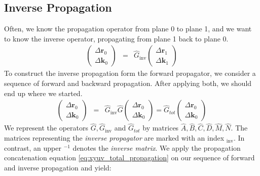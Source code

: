 \documentclass[12pt,a4paper,twoside,openright,BCOR10mm,headsepline,titlepage,abstracton,chapterprefix,final]{scrreprt}
\newcommand\Vector[1]{{\mathbf{#1}}}
\newcommand\wavenumber{k}
\newcommand\Wavevector{\Vector{\wavenumber}}
\begin{document}
\subsection{Inverse Propagation}
Often, we know the propagation operator from plane 0 to plane 1, and we want to know the inverse operator,
propagating from plane 1 back to plane 0.
\begin{eqnarray}
 \begin{pmatrix}
  \Delta \Vector{r}_{0} \\ \Delta \Wavevector_{0}
 \end{pmatrix}
 &=&
 \hat{G}_{\text{inv}}
 \begin{pmatrix}
  \Delta \Vector{r}_{1} \\ \Delta \Wavevector_{1}
 \end{pmatrix}
\end{eqnarray}
To construct the inverse propagation form the forward propagator,
we consider a sequence of forward and backward propagation.
After applying both, we should end up where we started.
\begin{eqnarray}
 \begin{pmatrix}
  \Delta \Vector{r}_{0} \\ \Delta \Wavevector_{0}
 \end{pmatrix}
 &=&
 \hat{G}_{\text{inv}}
 \hat{G}
 \begin{pmatrix}
  \Delta \Vector{r}_{0} \\ \Delta \Wavevector_{0}
 \end{pmatrix}
 =  
 \hat{G}_{tot}
  \begin{pmatrix}
  \Delta \Vector{r}_{0} \\ \Delta \Wavevector_{0}
 \end{pmatrix}
\end{eqnarray}
We represent the operators $\hat{G}, \hat{G}_{\text{inv}}$ and $\hat{G}_{tot}$ by matrices $\hat{A},\hat{B},\hat{C},\hat{D},\hat{M},\hat{N}$.
The matrices representing the \emph{inverse propagator} are marked with an index $_\text{inv}$.
In contrast, an upper $^{-1}$ denotes the \emph{inverse matrix}.
We apply the propagation concatenation equation \eqref{eq:xyuv_total_propagation} on our sequence of forward and inverse propagation and yield:
\end{document}
